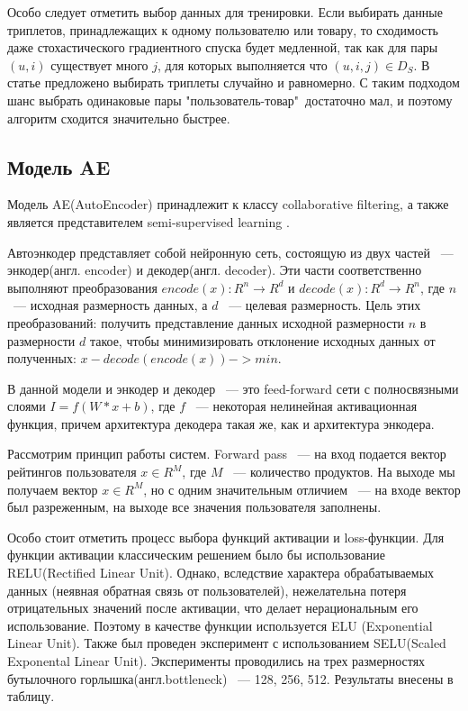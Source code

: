 \documentclass[14pt]{mmcs_article}
\begin{document}
Особо следует отметить выбор данных для тренировки. Если выбирать данные триплетов, принадлежащих к одному пользователю или товару, то сходимость даже стохастического градиентного спуска будет медленной, так как для пары $(u,i)$ существует много $j$, для которых выполняется что $(u,i,j) \in D_S$. В статье \cite{BPR:1205} предложено выбирать триплеты случайно и равномерно. С таким подходом шанс выбрать одинаковые пары "пользователь-товар"\ достаточно мал, и поэтому алгоритм сходится значительно быстрее.

\subsection{ Модель AE}
Модель AE(AutoEncoder) принадлежит к классу collaborative filtering, а также является представителем semi-supervised learning \cite{AE:a1}. 

Автоэнкодер представляет собой нейронную сеть, состоящую из двух частей ~--- энкодер(англ. encoder) и декодер(англ. decoder). Эти части соответственно выполняют преобразования  $encode(x) : R^n \rightarrow R^d$ и $decode(x) : R^d \rightarrow R^n$, где $n$ ~--- исходная размерность данных, а $d$ ~--- целевая размерность. Цель этих преобразований: получить представление данных исходной размерности $n$ в размерности $d$ такое, чтобы минимизировать отклонение исходных данных от полученных: $x - decode(encode(x)) -> min$.

В данной модели и энкодер и декодер ~--- это feed-forward сети с полносвязными слоями $I = f(W*x + b)$, где $f$ ~--- некоторая нелинейная активационная функция, причем архитектура декодера такая же, как и архитектура энкодера. 

Рассмотрим принцип работы систем. Forward pass ~--- на вход подается вектор рейтингов пользователя $x \in R^M$, где $M$ ~--- количество продуктов. На выходе мы получаем вектор $x \in R^M$, но с одним значительным отличием ~--- на входе вектор был разреженным, на выходе все значения пользователя заполнены.

Особо стоит отметить процесс выбора функций активации и loss-функции. Для функции активации классическим решением было бы использование RELU(Rectified Linear Unit). Однако, вследствие характера обрабатываемых данных (неявная обратная связь от пользователей), нежелательна потеря отрицательных значений после активации, что делает нерациональным его использование. Поэтому в качестве функции используется ELU (Exponential Linear Unit). Также был проведен эксперимент с использованием SELU(Scaled Exponental Linear Unit). Эксперименты проводились на трех размерностях бутылочного горлышка(англ.bottleneck) ~--- 128, 256, 512. Результаты внесены в таблицу.\\
\end{document}
